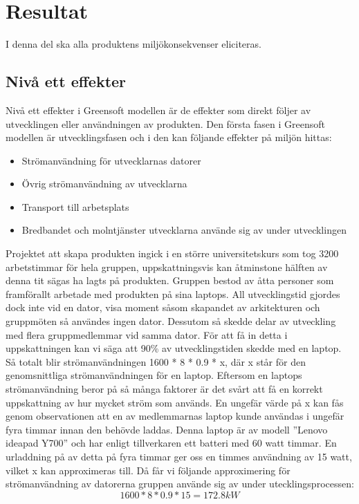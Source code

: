 \section{Resultat}
\label{sec:joel_a-results}
I denna del ska alla produktens miljökonsekvenser eliciteras. 

\subsection{Nivå ett effekter}
Nivå ett effekter i Greensoft modellen är de effekter som direkt följer av utvecklingen eller användningen av produkten. Den första fasen i Greensoft modellen är utvecklingsfasen och i den kan följande effekter på miljön hittas:
\begin{itemize}
	\item Strömanvändning för utvecklarnas datorer
	\item Övrig strömanvändning av utvecklarna
	\item Transport till arbetsplats
	\item Bredbandet och molntjänster utvecklarna använde sig av under utvecklingen
\end{itemize}

Projektet att skapa produkten ingick i en större universitetskurs som tog 3200 arbetstimmar för hela gruppen, uppskattningsvis kan åtminstone hälften av denna tit sägas ha lagts på produkten. Gruppen bestod av åtta personer som framförallt arbetade med produkten på sina laptops. All utvecklingstid gjordes dock inte vid en dator, visa moment såsom skapandet av arkitekturen och gruppmöten så användes ingen dator. Dessutom så skedde delar av utveckling med flera gruppmedlemmar vid samma dator. För att få in detta i uppskattningen kan vi säga att 90\% av utvecklingstiden skedde med en laptop. Så totalt blir strömanvändningen 1600 * 8 * 0.9 * x, där x står för den genomsnittliga strömanvändningen för en laptop. Eftersom en laptops strömanvändning beror på så många faktorer är det svårt att få en korrekt uppskattning av hur mycket ström som används. En ungefär värde på x kan fås genom observationen att en av medlemmarnas laptop kunde användas i ungefär fyra timmar innan den behövde laddas. Denna laptop är av modell ''Lenovo ideapad Y700'' och har enligt tillverkaren \cite{lenovo} ett batteri med 60 watt timmar. En urladdning på av detta på fyra timmar ger oss en timmes användning av 15 watt, vilket x kan approximeras till. Då får vi följande approximering för strömanvändning av datorerna gruppen använde sig av under utecklingsprocessen: $$1600 * 8 * 0.9 * 15 = 172.8kW$$

